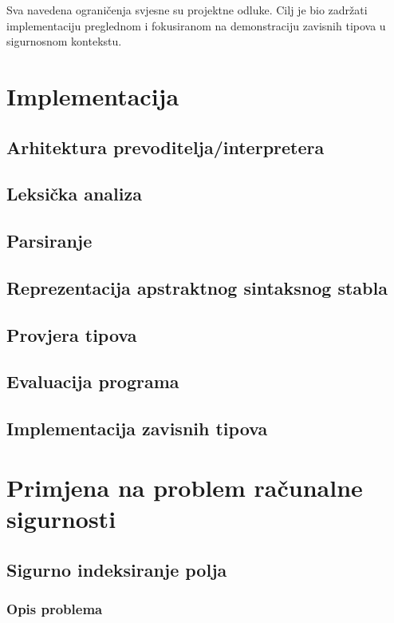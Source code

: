 \documentclass[diplomskirad,upload]{fer}
\begin{document}
Sva navedena ograničenja svjesne su projektne odluke. Cilj je bio zadržati
implementaciju preglednom i fokusiranom na demonstraciju zavisnih tipova u
sigurnosnom kontekstu.

\chapter{Implementacija}

\section{Arhitektura prevoditelja/interpretera}

\section{Leksička analiza}

\section{Parsiranje}

\section{Reprezentacija apstraktnog sintaksnog stabla}

\section{Provjera tipova}

\section{Evaluacija programa}

\section{Implementacija zavisnih tipova}

\chapter{Primjena na problem računalne sigurnosti}

\section{Sigurno indeksiranje polja}

\subsection{Opis problema}
\end{document}
